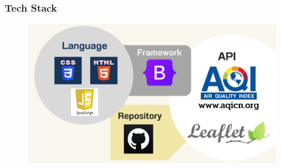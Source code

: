 \documentclass[12pt,aspectratio=169]{beamer}
\begin{document}
\begin{frame}
\frametitle{Tech Stack}
    \begin{center}
        \begin{figure}
            \centering
            \includegraphics[width=\textwidth]{img/tech-stack.pdf}
        \end{figure}
    \end{center}
\end{frame}
\end{document}
